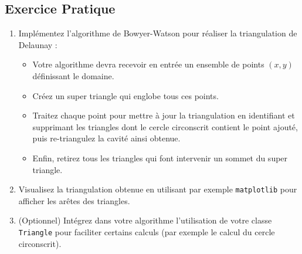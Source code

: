 \documentclass[a4paper,12pt]{article}
\theoremstyle{definition}
\begin{document}
\subsection{Exercice Pratique}
\begin{enumerate}
  \item Implémentez l'algorithme de Bowyer-Watson pour réaliser la triangulation de Delaunay :
    \begin{itemize}
      \item Votre algorithme devra recevoir en entrée un ensemble de points \((x,y)\) définissant le domaine.
      \item Créez un super triangle qui englobe tous ces points.
      \item Traitez chaque point pour mettre à jour la triangulation en identifiant et supprimant les triangles dont le cercle circonscrit contient le point ajouté, puis re-triangulez la cavité ainsi obtenue.
      \item Enfin, retirez tous les triangles qui font intervenir un sommet du super triangle.
    \end{itemize}
  \item Visualisez la triangulation obtenue en utilisant par exemple \texttt{matplotlib} pour afficher les arêtes des triangles.
  \item (Optionnel) Intégrez dans votre algorithme l’utilisation de votre classe \texttt{Triangle} pour faciliter certains calculs (par exemple le calcul du cercle circonscrit).
\end{enumerate}

\end{document}

